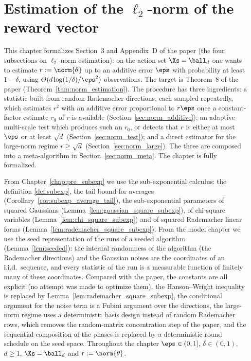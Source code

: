 \chapter{Estimation of the \texorpdfstring{$\ell_2$}{l2}-norm of the reward vector}
\label{chap:norm}

This chapter formalizes Section~3 and Appendix~D of the paper (the four subsections on
$\ell_2$-norm estimation): on the action set $\Xs = \ball_d$ one wants to estimate
$r := \norm{\theta}$ up to an additive error $\eps$ with probability at least $1-\delta$,
using $O(d\log(1/\delta)/\eps^2)$ observations. The target is Theorem~8 of the paper
(Theorem~\ref{thm:norm_estimation}). The procedure has three ingredients: a statistic
built from random Rademacher directions, each sampled repeatedly, which estimates $r^2$ with
an additive error proportional to $r\eps$ once a constant-factor estimate $r_0$ of $r$ is
available (Section~\ref{sec:norm_additive}); an adaptive multi-scale test which produces
such an $r_0$, or detects that $r$ is either at most $\eps$ or at least $\sqrt d$
(Section~\ref{sec:norm_test}); and a direct estimator for the large-norm regime
$r \ge \sqrt d$ (Section~\ref{sec:norm_large}). The three are composed into a
meta-algorithm in Section~\ref{sec:norm_meta}. The chapter is fully formalized.

From Chapter~\ref{chap:pre_subexp} we use the sub-exponential calculus: the definition
\ref{def:subexp}, the tail bound for averages (Corollary~\ref{cor:subexp_average_tail}), the
sub-exponential parameters of squared Gaussians (Lemma~\ref{lem:gaussian_square_subexp}), of
chi-square variables (Lemma~\ref{lem:chi_square_subexp}) and of squared Rademacher linear
forms (Lemma~\ref{lem:rademacher_square_subexp}). From the model chapter we use the seed
representation of the runs of a seeded algorithm (Lemma~\ref{lem:seeded}): the internal
randomness of the algorithm (the Rademacher directions) and the Gaussian noises are the
coordinates of an i.i.d.\ sequence, and every statistic of the run is a measurable
function of finitely many of these coordinates. Compared with the paper, the constants are
all explicit (no attempt was made to optimize them), the Hanson--Wright inequality is
replaced by Lemma~\ref{lem:rademacher_square_subexp}, the conditional argument for the noise
term is a Fubini argument over the directions, the large-norm regime uses a deterministic
basis design instead of random Rademacher rows, which removes the random-matrix
concentration step of the paper, and the sequential composition of the phases is replaced
by a deterministic round schedule on the seed space. Throughout the chapter $\eps \in (0,1]$, $\delta \in (0,1)$, $d \ge 1$,
$\Xs = \ball_d$ and $r := \norm{\theta}$.

